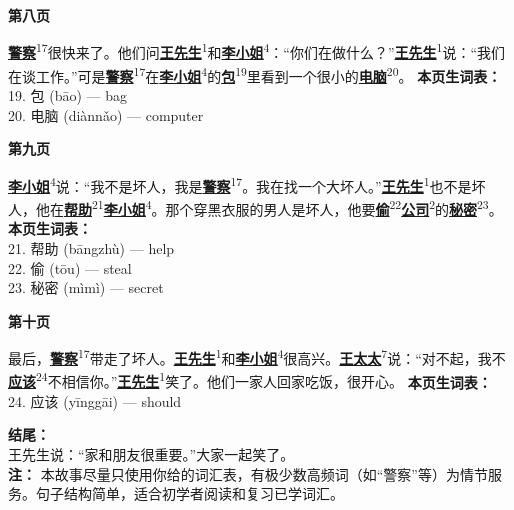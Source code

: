 \documentclass[20pt]{extarticle}
\newcommand{\glossedword}[2]{\uline{\textbf{#1}}\textsuperscript{#2}}
\begin{document}
\begin{center}
    {\fontsize{36}{44}\selectfont \textbf{第八页}}
\end{center}
\vspace{2em}
{\fontsize{22}{30}\selectfont
\noindent
\glossedword{警察}{17}很快来了。他们问\glossedword{王先生}{1}和\glossedword{李小姐}{4}：“你们在做什么？”\glossedword{王先生}{1}说：“我们在谈工作。”可是\glossedword{警察}{17}在\glossedword{李小姐}{4}的\glossedword{包}{19}里看到一个很小的\glossedword{电脑}{20}。
}
\vfill
{\fontsize{18}{26}\selectfont
\noindent
\textbf{本页生词表：}\\[0.5em]
19. 包 (bāo) — bag\\
20. 电脑 (diànnǎo) — computer
}
\newpage

\begin{center}
    {\fontsize{36}{44}\selectfont \textbf{第九页}}
\end{center}
\vspace{2em}
{\fontsize{22}{30}\selectfont
\noindent
\glossedword{李小姐}{4}说：“我不是坏人，我是\glossedword{警察}{17}。我在找一个大坏人。”\glossedword{王先生}{1}也不是坏人，他在\glossedword{帮助}{21}\glossedword{李小姐}{4}。那个穿黑衣服的男人是坏人，他要\glossedword{偷}{22}\glossedword{公司}{2}的\glossedword{秘密}{23}。
}
\vfill
{\fontsize{18}{26}\selectfont
\noindent
\textbf{本页生词表：}\\[0.5em]
21. 帮助 (bāngzhù) — help\\
22. 偷 (tōu) — steal\\
23. 秘密 (mìmì) — secret
}
\newpage

\begin{center}
    {\fontsize{36}{44}\selectfont \textbf{第十页}}
\end{center}
\vspace{2em}
{\fontsize{22}{30}\selectfont
\noindent
最后，\glossedword{警察}{17}带走了坏人。\glossedword{王先生}{1}和\glossedword{李小姐}{4}很高兴。\glossedword{王太太}{7}说：“对不起，我不\glossedword{应该}{24}不相信你。”\glossedword{王先生}{1}笑了。他们一家人回家吃饭，很开心。
}
\vfill
{\fontsize{18}{26}\selectfont
\noindent
\textbf{本页生词表：}\\[0.5em]
24. 应该 (yīnggāi) — should
}

\vfill
{\fontsize{20}{28}\selectfont
\noindent
\textbf{结尾：} \\
王先生说：“家和朋友很重要。”大家一起笑了。\\[2em]
\textbf{注：} 本故事尽量只使用你给的词汇表，有极少数高频词（如“警察”等）为情节服务。句子结构简单，适合初学者阅读和复习已学词汇。
}
\end{document}
